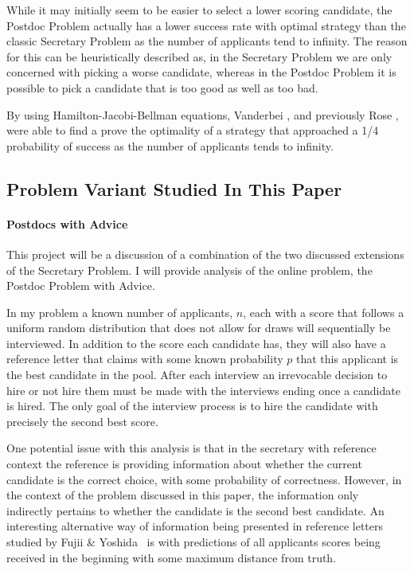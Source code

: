 \documentclass[a4paper,11pt]{article}
\begin{document}
While it may initially seem to be easier to select a lower scoring candidate, the Postdoc Problem actually has a lower success rate with optimal strategy than the classic Secretary Problem as the number of applicants tend to infinity. The reason for this can be heuristically described as, in the Secretary Problem we are only concerned with picking a worse candidate, whereas in the Postdoc Problem it is possible to pick a candidate that is too good as well as too bad.

By using Hamilton-Jacobi-Bellman equations, Vanderbei \cite{vanderbei2011postdoc}, and previously Rose \cite{Rose}, were able to find a prove the optimality of a strategy that approached a 1/4 probability of success as the number of applicants tends to infinity. 

\subsection{Problem Variant Studied In This Paper} 

\paragraph{Postdocs with Advice}

This project will be a discussion of a combination of the two discussed extensions of the Secretary Problem. I will provide analysis of the online problem, the Postdoc Problem with Advice. 

In my problem a known number of applicants, $n$,  each with a score that follows a uniform random distribution that does not allow for draws will sequentially be interviewed. In addition to the score each candidate has, they will also have a reference letter that claims with some known probability $p$ that this applicant is the best candidate in the pool. After each interview an irrevocable decision to hire or not hire them must be made with the interviews ending once a candidate is hired. The only goal of the interview process is to hire the candidate with precisely the second best score.

One potential issue with this analysis is that in the secretary with reference context the reference is providing information about whether the current candidate is the correct choice, with some probability of correctness. However, in the context of the problem discussed in this paper, the information only indirectly pertains to whether the candidate is the second best candidate. An interesting alternative way of information being presented in reference letters studied by Fujii \& Yoshida~\cite{Fujii_2024} is with predictions of all applicants scores being received in the beginning with some maximum distance from truth. 
\end{document}
